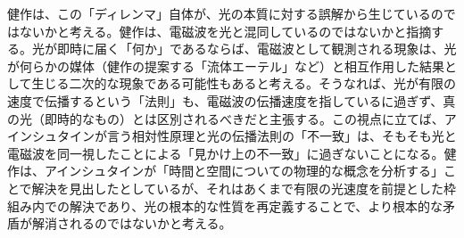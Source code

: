 \documentclass{article}
\begin{document}
健作は、この「ディレンマ」自体が、光の本質に対する誤解から生じているのではないかと考える。健作は、電磁波を光と混同しているのではないかと指摘する。光が即時に届く「何か」であるならば、電磁波として観測される現象は、光が何らかの媒体（健作の提案する「流体エーテル」など）と相互作用した結果として生じる二次的な現象である可能性もあると考える。そうなれば、光が有限の速度で伝播するという「法則」も、電磁波の伝播速度を指しているに過ぎず、真の光（即時的なもの）とは区別されるべきだと主張する。この視点に立てば、アインシュタインが言う相対性原理と光の伝播法則の「不一致」は、そもそも光と電磁波を同一視したことによる「見かけ上の不一致」に過ぎないことになる。健作は、アインシュタインが「時間と空間についての物理的な概念を分析する」ことで解決を見出したとしているが、それはあくまで有限の光速度を前提とした枠組み内での解決であり、光の根本的な性質を再定義することで、より根本的な矛盾が解消されるのではないかと考える。
\end{document}

